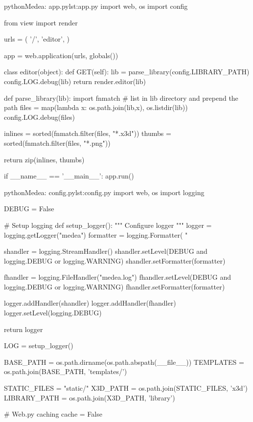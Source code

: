 \begin{mylisting}{python}{Medea: app.py}{lst:app.py}
import web, os
import config

from view import render

urls = (
        '/', 'editor',
)


app = web.application(urls, globals())


class editor(object):
    def GET(self):
        lib = parse_library(config.LIBRARY_PATH)
        config.LOG.debug(lib)
        return render.editor(lib)


def parse_library(lib):
    import fnmatch
    # list in lib directory and prepend the path
    files = map(lambda x: os.path.join(lib,x), os.listdir(lib)) 
    config.LOG.debug(files)
    
    inlines = sorted(fnmatch.filter(files, "*.x3d"))
    thumbs = sorted(fnmatch.filter(files, "*.png"))

    return zip(inlines, thumbs)


if __name__ == '__main__':
    app.run()
\end{mylisting}

\begin{mylisting}{python}{Medea: config.py}{lst:config.py}
import web, os
import logging

DEBUG = False

# Setup logging
def setup_logger():
    """ Configure logger """
    logger = logging.getLogger("medea")
    formatter = logging.Formatter(
                    "%

    shandler = logging.StreamHandler()
    shandler.setLevel(DEBUG and logging.DEBUG or logging.WARNING)
    shandler.setFormatter(formatter)

    fhandler = logging.FileHandler("medea.log")
    fhandler.setLevel(DEBUG and logging.DEBUG or logging.WARNING)
    fhandler.setFormatter(formatter)

    logger.addHandler(shandler)
    logger.addHandler(fhandler)
    logger.setLevel(logging.DEBUG)

    return logger

LOG = setup_logger()


BASE_PATH = os.path.dirname(os.path.abspath(__file__))
TEMPLATES = os.path.join(BASE_PATH, 'templates/')

STATIC_FILES = "static/"
X3D_PATH = os.path.join(STATIC_FILES, 'x3d')
LIBRARY_PATH = os.path.join(X3D_PATH, 'library')

# Web.py caching
cache = False
\end{mylisting}

